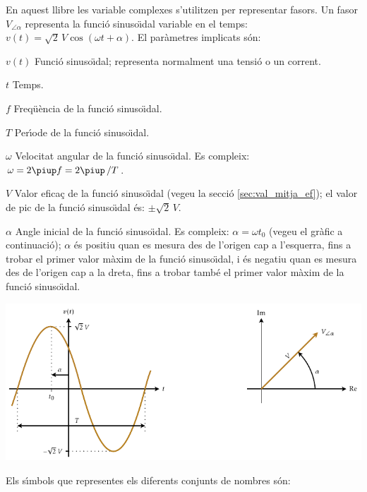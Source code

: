 En aquest llibre les variable complexes s'utilitzen per representar fasors. Un fasor $V_{\angle \alpha}$ representa la funci\'{o} sinuso\"{\i}dal variable en el temps: $v(t)=\sqrt{2}\, V \cos(\omega t + \alpha)$. El par\`{a}metres implicats s\'{o}n:
\begin{list}{}
{\setlength{\labelwidth}{15mm} \setlength{\leftmargin}{20mm}
\setlength{\labelsep}{5mm}}
    \item[$v(t)$] Funci\'{o} sinuso\"{\i}dal; representa normalment una tensi\'{o} o un corrent.
    \item[$t$] Temps.
    \item[$f$] Freq\"{u}\`{e}ncia de la funci\'{o} sinuso\"{\i}dal.
    \item[$T$] Per\'{\i}ode de la funci\'{o} sinuso\"{\i}dal.
    \item[$\omega$] Velocitat angular de la funci\'{o} sinuso\"{\i}dal. Es compleix: $\omega = 2 \piup f = 2 \piup\,/T$.
    \item[$V$] Valor efica\c{c} de la funci\'{o} sinuso\"{\i}dal (vegeu la secci\'{o} \vref{sec:val_mitja_ef}); el valor de pic de la funci\'{o} sinuso\"{\i}dal \'{e}s:  $\pm\sqrt{2}\, V$.
    \item[$\alpha$] Angle inicial de la funci\'{o} sinuso\"{\i}dal. Es compleix:  $\alpha=\omega t_0$ (vegeu el gr\`{a}fic a continuaci\'{o}); $\alpha$ \'{e}s positiu quan es mesura des de l'origen cap a l'esquerra, fins a trobar el primer valor m\`{a}xim de la funci\'{o} sinuso\"{\i}dal, i \'{e}s negatiu quan es mesura des de l'origen cap a la dreta, fins a trobar tamb\'{e} el primer valor m\`{a}xim de la funci\'{o} sinuso\"{\i}dal.
    \item[] \includegraphics{Imatges/Not-Fasor.pdf}
\end{list}

Els s\'{\i}mbols que representes els diferents conjunts de nombres s\'{o}n:

